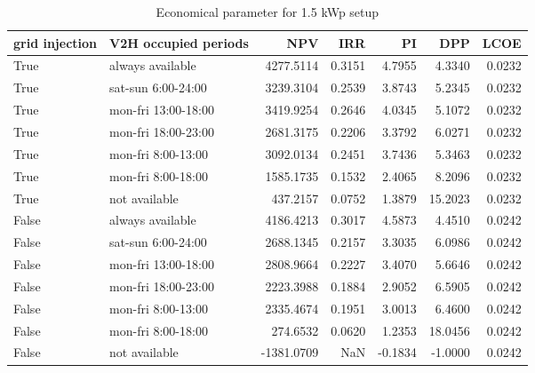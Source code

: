 \begin{table}
\centering
\caption{Economical parameter for 1.5 kWp setup}
\label{tab:results-1.5}
\begin{tabular}{llrrrrr}
\toprule
 grid injection & V2H occupied periods &        NPV &    IRR &      PI &     DPP &   LCOE \\
\midrule
           True &     always available &  4277.5114 & 0.3151 &  4.7955 &  4.3340 & 0.0232 \\
           True &   sat-sun 6:00-24:00 &  3239.3104 & 0.2539 &  3.8743 &  5.2345 & 0.0232 \\
           True &  mon-fri 13:00-18:00 &  3419.9254 & 0.2646 &  4.0345 &  5.1072 & 0.0232 \\
           True &  mon-fri 18:00-23:00 &  2681.3175 & 0.2206 &  3.3792 &  6.0271 & 0.0232 \\
           True &   mon-fri 8:00-13:00 &  3092.0134 & 0.2451 &  3.7436 &  5.3463 & 0.0232 \\
           True &   mon-fri 8:00-18:00 &  1585.1735 & 0.1532 &  2.4065 &  8.2096 & 0.0232 \\
           True &        not available &   437.2157 & 0.0752 &  1.3879 & 15.2023 & 0.0232 \\
          False &     always available &  4186.4213 & 0.3017 &  4.5873 &  4.4510 & 0.0242 \\
          False &   sat-sun 6:00-24:00 &  2688.1345 & 0.2157 &  3.3035 &  6.0986 & 0.0242 \\
          False &  mon-fri 13:00-18:00 &  2808.9664 & 0.2227 &  3.4070 &  5.6646 & 0.0242 \\
          False &  mon-fri 18:00-23:00 &  2223.3988 & 0.1884 &  2.9052 &  6.5905 & 0.0242 \\
          False &   mon-fri 8:00-13:00 &  2335.4674 & 0.1951 &  3.0013 &  6.4600 & 0.0242 \\
          False &   mon-fri 8:00-18:00 &   274.6532 & 0.0620 &  1.2353 & 18.0456 & 0.0242 \\
          False &        not available & -1381.0709 &    NaN & -0.1834 & -1.0000 & 0.0242 \\
\bottomrule
\end{tabular}
\end{table}
